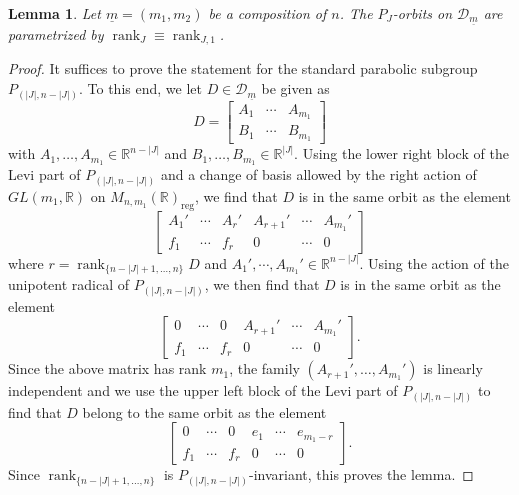 \documentclass[pdftex]{sigma}
\numberwithin{equation}{section}
\newtheorem{Lemma}[Theorem]{Lemma}
\theoremstyle{definition}
\newcommand{\rank}{\operatorname{rank}}
\newcommand{\R}{\mathbb{R}}
\newcommand{\D}{\mathcal{D}}
\theoremstyle{plain}
\theoremstyle{plain}
\theoremstyle{plain}
\theoremstyle{plain}
\begin{document}
\begin{Lemma}{\label{lemme_rank}}
	Let $\underline m = (m_1,m_2)$ be a composition of $n$. The $P_J$-orbits on $\D_{\underline m}$ are parametrized by $\rank_{J} \equiv \rank_{J,1}$.
\end{Lemma}
\begin{proof}
	It suffices to prove the statement for the standard parabolic subgroup $P_{(|J|,n-|J|)}$. To this end, we let $D \in \D_{\underline m}$ be given as
	\begin{equation*}
		D = \begin{bmatrix}
		A_1 & \cdots & A_{m_1} \\
		B_1 & \cdots & B_{m_1}
	\end{bmatrix}
	\end{equation*}
	with $A_1,\dots,A_{m_1} \in \R^{n-|J|}$ and $B_1,\dots,B_{m_1} \in \R^{|J|}$. Using the lower right block of the Levi part of $P_{(|J|,n-|J|)}$ and a change of basis allowed by the right action of $GL(m_1,\R)$ on $M_{n,m_1}(\R)_{\mathrm{reg}}$, we find that $D$ is in the same orbit as the element
	\begin{equation*}
		\begin{bmatrix}
		A_1' & \cdots & A_r' & A_{r+1}' & \cdots & A_{m_1}' \\
		f_1 & \cdots & f_r & 0 & \cdots & 0
	\end{bmatrix}
	\end{equation*}
	where $r = \rank_{\{n-|J|+1,\dots,n\}}D$ and $A_1',\cdots, A_{m_1}' \in \R^{n-|J|}$. Using the action of the unipotent radical of $P_{(|J|,n-|J|)}$, we then find that $D$ is in the same orbit as the element
	\begin{equation*}
		\begin{bmatrix}
		0 & \cdots & 0 & A_{r+1}' & \cdots & A_{m_1}' \\
		f_1 & \cdots & f_r & 0 & \cdots & 0
	\end{bmatrix}.
	\end{equation*}
	Since the above matrix has rank $m_1$, the family $(A_{r+1}',\dots,A_{m_1}')$ is linearly independent and we use the upper left block of the Levi part of $P_{(|J|,n-|J|)}$ to find that
	$D$ belong to the same orbit as the element
	\begin{equation*}
		\begin{bmatrix}
		0 & \cdots & 0 & e_1 & \cdots & e_{m_1-r} \\
		f_1 & \cdots & f_r & 0 & \cdots & 0
	\end{bmatrix}.
	\end{equation*}
	Since $\rank_{\{n-|J|+1,\dots,n\}}$ is $P_{(|J|,n-|J|)}$-invariant, this proves the lemma.
\end{proof}
\end{document}
